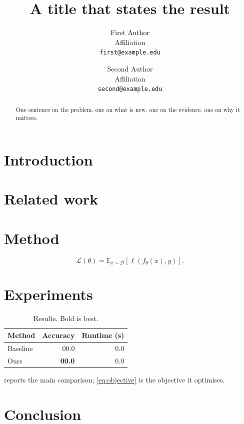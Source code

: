 \documentclass[10pt,twocolumn,letterpaper]{article}
\title{A title that states the result}
\author{First Author\\ Affiliation\\ \texttt{first@example.edu}
  \and Second Author\\ Affiliation\\ \texttt{second@example.edu}}
\date{}
\begin{document}
\maketitle

\begin{abstract}
One sentence on the problem, one on what is new, one on the evidence, one on why it matters.
\end{abstract}

\section{Introduction}
\label{sec:intro}

\section{Related work}
\label{sec:related}

\section{Method}
\label{sec:method}

\begin{equation}
  \label{eq:objective}
  \mathcal{L}(\theta) = \mathbb{E}_{x \sim \mathcal{D}} \left[ \ell(f_\theta(x), y) \right].
\end{equation}

\section{Experiments}
\label{sec:experiments}

\begin{table}[t]
  \centering
  \caption{Results. Bold is best.}
  \label{tab:main}
  \begin{tabular}{lrr}
    \toprule
    Method & Accuracy & Runtime (s) \\
    \midrule
    Baseline & 00.0 & 0.0 \\
    Ours     & \textbf{00.0} & 0.0 \\
    \bottomrule
  \end{tabular}
\end{table}

 reports the main comparison; \cref{eq:objective} is the objective it optimises.

\section{Conclusion}
\label{sec:conclusion}



\end{document}
